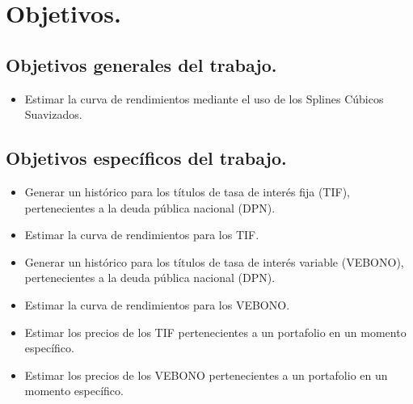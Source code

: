 \newpage

\section{Objetivos.}

\subsection{Objetivos  generales del trabajo.}

\begin{itemize}
  \item Estimar la curva de rendimientos mediante el uso de los Splines C\'ubicos Suavizados.
\end{itemize}

\subsection{Objetivos espec\'ificos del trabajo.}

\begin{itemize}
  \item Generar un hist\'orico para los t\'itulos de tasa de inter\'es fija (TIF), pertenecientes a la deuda p\'ublica nacional (DPN).
  \item Estimar la curva de rendimientos para los TIF.
  \item Generar un hist\'orico para los t\'itulos de tasa de inter\'es variable (VEBONO), pertenecientes a la deuda p\'ublica nacional (DPN).
  \item Estimar la curva de rendimientos para los VEBONO.
  \item Estimar los precios de los TIF pertenecientes a un portafolio en un momento espec\'ifico.
  \item Estimar los precios de los VEBONO pertenecientes a un portafolio en un momento espec\'ifico.

\end{itemize}



